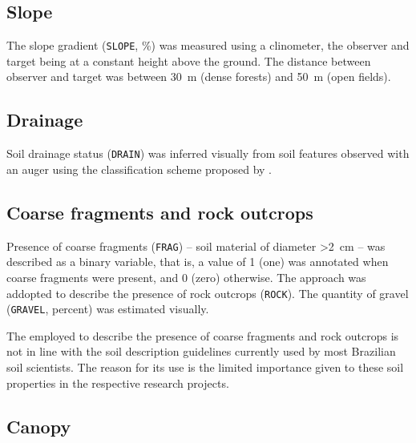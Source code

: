 
\tocless\subsection{Slope}

The slope gradient (\texttt{SLOPE}, \si{\percent}) was measured using a clinometer, the observer
and target being at a constant height above the ground. The distance between observer and target was 
between \SI{30}{\metre} (dense forests) and \SI{50}{\metre} (open fields).

\tocless\subsection{Drainage}

Soil drainage status (\texttt{DRAIN}) was inferred visually from soil features observed with an 
auger using the classification scheme proposed by .

\tocless\subsection{Coarse fragments and rock outcrops}

Presence of coarse fragments (\texttt{FRAG}) -- soil material of diameter \SI{>2}{\centi\metre} -- was described 
as a binary variable, that is, a value of \num{1} (one) was annotated when coarse fragments were present, and 
\num{0} (zero) otherwise. The approach was addopted to describe the presence of rock outcrops (\texttt{ROCK}). The 
quantity of gravel (\texttt{GRAVEL}, \si{percent}) was estimated visually.

The employed to describe the presence of coarse fragments and rock outcrops is not in line with the soil 
description guidelines currently used by most Brazilian soil scientists. The reason for its use is the limited 
importance given to these soil properties in the respective research projects.

\tocless\subsection{Canopy}

